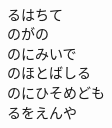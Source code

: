 \documentclass[10pt,b5j]{tarticle} %
\begin{document}
\begin{enumerate}
\begin{minipage}[c]{\blocksize}
    \end{minipage}
    \begin{minipage}[c]{\blocksize}
        
        \vspace{\linespace}
        \item~\\
        るはちて\\
        のがの\\
        のにみいで\\
        のほとばしる\\
        のにひそめども\\
        るをえんや
    
    \end{minipage}
\end{enumerate} %
\end{document}
